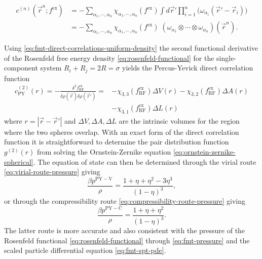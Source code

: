 \begin{equation}\label{eq:fmt-direct-correlations-uniform-density}
  \begin{split}
    c^{(n)}(\vec{r}^n; f^\mathrm{ex})
    &=
    - \sum_{\alpha_1, \cdots, \alpha_n}
    \chi_{\alpha_1, \cdots, \alpha_n}(f^\mathrm{ex})
    \int d\vec{r}'
    \prod_{i=1}^n \Big( \omega_{\alpha_i}(\vec{r}' - \vec{r}_i) \Big)
    \\ &=
    - \sum_{\alpha_1, \cdots, \alpha_n}
    \chi_{\alpha_1, \cdots, \alpha_n}(f^\mathrm{ex}) \;
    (\omega_{\alpha_1} \otimes \cdots \otimes \omega_{\alpha_n})
    (\vec{r}^n).
  \end{split}
\end{equation}

\vspace{0.5em}
\begin{tcolorbox}[title=Percus-Yevick theory in hard spheres]
  Using \eqref{eq:fmt-direct-correlations-uniform-density} the second functional derivative of the Rosenfeld free energy density \eqref{eq:rosenfeld-functional} for the single-component system $R_i + R_j = 2R = \sigma$ yields the Percus-Yevick direct correlation function \cite{RosenfeldJCP1988,WertheimPRL1963}
  \begin{align}
    c^{(2)}_\mathrm{PY}(r)
    =
    - \frac{\delta^2 f_\mathrm{RF}^\mathrm{ex}}{\delta \rho(\vec{r}) \delta \rho(\vec{r}')}
    =&
    - \chi_{3,3}(f_\mathrm{RF}^\mathrm{ex}) \Delta V(r)
    - \chi_{3,2}(f_\mathrm{RF}^\mathrm{ex}) \Delta A(r)
    \nonumber \\ &
    - \chi_{3,1}(f_\mathrm{RF}^\mathrm{ex}) \Delta L(r)
  \end{align}
  where $r = |\vec{r} - \vec{r}'|$ and $\Delta V, \Delta A, \Delta L$ are the intrinsic volumes for the region where the two spheres overlap.
  With an exact form of the direct correlation function it is straightforward to determine the pair distribution function $g^{(2)}(r)$ from solving the Ornstein-Zernike equation \eqref{eq:ornstein-zernike-spherical}.
  The equation of state can then be determined through the virial route \eqref{eq:virial-route-pressure} giving
  \begin{equation}
    \frac{\beta p^\mathrm{PY-V}}{\rho}
    =
    \frac{1 + \eta + \eta^2 - 3\eta^3}{(1 - \eta)^3},
  \end{equation}
  or through the compressibility route \eqref{eq:compressibility-route-pressure} giving
  \begin{equation}\label{eq:pyc-pressure}
    \frac{\beta p^\mathrm{PY-C}}{\rho}
    =
    \frac{1 + \eta + \eta^2}{(1 - \eta)^3}.
  \end{equation}
  The latter route is more accurate and also consistent with the pressure of the Rosenfeld functional \eqref{eq:rosenfeld-functional} through \eqref{eq:fmt-pressure} and the scaled particle differential equation%
  \eqref{eq:fmt-spt-pde}.
\end{tcolorbox}

